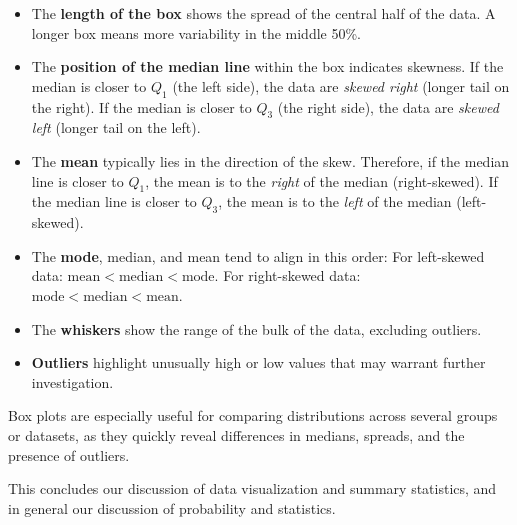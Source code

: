 \begin{itemize}
    \item The \textbf{length of the box} shows the spread of the central half of the data. A longer box means more variability in the middle 50\%.
    \item The \textbf{position of the median line} within the box indicates skewness.  
    If the median is closer to $Q_1$ (the left side), the data are \emph{skewed right} (longer tail on the right).  
    If the median is closer to $Q_3$ (the right side), the data are \emph{skewed left} (longer tail on the left).
    \item The \textbf{mean} typically lies in the direction of the skew.  
    Therefore, if the median line is closer to $Q_1$, the mean is to the \emph{right} of the median (right-skewed).  
    If the median line is closer to $Q_3$, the mean is to the \emph{left} of the median (left-skewed).
    \item The \textbf{mode}, median, and mean tend to align in this order:  
    For left-skewed data: $\text{mean} < \text{median} < \text{mode}$.  
    For right-skewed data: $\text{mode} < \text{median} < \text{mean}$.
    \item The \textbf{whiskers} show the range of the bulk of the data, excluding outliers.
    \item \textbf{Outliers} highlight unusually high or low values that may warrant further investigation.
\end{itemize}


Box plots are especially useful for comparing distributions across several groups or datasets, as they quickly reveal differences in medians, spreads, and the presence of outliers.

This concludes our discussion of data visualization and summary statistics, and in general our discussion of probability and statistics.